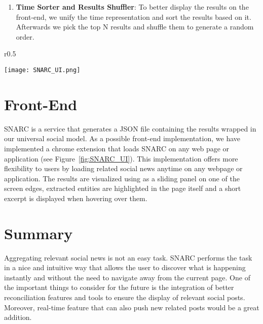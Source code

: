 \begin{enumerate}
  \item \textbf{Time Sorter and Results Shuffler}: To better display the results on the front-end, we unify the time representation and sort the results based on it. Afterwards we pick the top N results and shuffle them to generate a random order.

\end{enumerate}


\begin{wrapfigure}{r}{0.5\textwidth}
  \begin{center}
    \texttt{[image: SNARC\_UI.png]}
  \end{center}
  \caption{SNARC's User Interface - The Google Chrome Extension}
  \label{fig:SNARC_UI}
\end{wrapfigure}

\section{Front-End}

SNARC is a service that generates a JSON file containing the results wrapped in our universal social model. As a possible front-end implementation, we have implemented a chrome extension that loads SNARC on any web page or application (see Figure~\ref{fig:SNARC_UI}). This implementation offers more flexibility to users by loading related social news anytime on any webpage or application. The results are visualized using as a sliding panel on one of the screen edges, extracted entities are highlighted in the page itself and a short excerpt is displayed when hovering over them.


\section{Summary}

Aggregating relevant social news is not an easy task. SNARC performs the task in a nice and intuitive way that allows the user to discover what is happening instantly and without the need to navigate away from the current page. One of the important things to consider for the future is the integration of better reconciliation features and tools to ensure the display of relevant social posts. Moreover, real-time feature that can also push new related posts would be a great addition.
